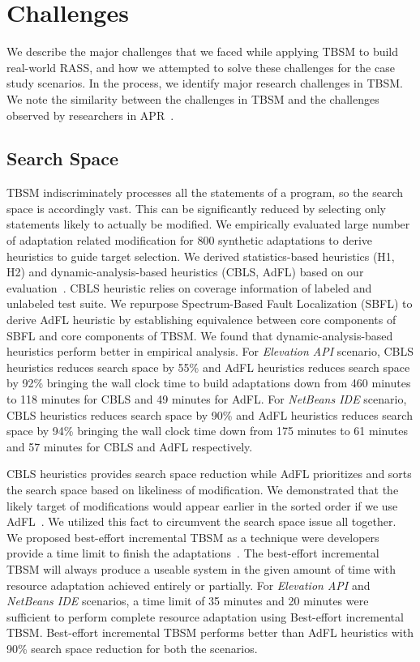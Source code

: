 \section{Challenges}
We describe the major challenges that we faced while applying TBSM to build real-world RASS, and how we attempted to solve these challenges for the case study scenarios. In the process, we identify major research challenges in TBSM. We note the similarity between the challenges in TBSM and the challenges observed by researchers in APR~\cite{LeGoues2013}.

\subsection{Search Space}
TBSM indiscriminately processes all the statements of a program, so the search space is accordingly vast. This can be significantly reduced by selecting only statements likely to actually be modified. We empirically evaluated large number of adaptation related modification for 800 synthetic adaptations to derive heuristics to guide target selection. We derived statistics-based heuristics (H1, H2) and dynamic-analysis-based heuristics (CBLS, AdFL) based on our evaluation~\cite{christi2018qrs,christi2019qrs}. CBLS heuristic relies on coverage information of labeled and unlabeled test suite. We repurpose Spectrum-Based Fault Localization (SBFL) to derive AdFL heuristic by establishing equivalence between core components of SBFL and core components of TBSM. We found that dynamic-analysis-based heuristics  perform better in empirical analysis. For \textit{Elevation API} scenario, CBLS heuristics reduces search space by 55\% and AdFL heuristics reduces search space by 92\% bringing the wall clock time to build adaptations down from 460 minutes to 118 minutes for CBLS and 49 minutes for AdFL.  For \textit{NetBeans IDE} scenario, CBLS heuristics reduces search space by 90\% and AdFL heuristics reduces search space by 94\% bringing the wall clock time down from 175 minutes to 61 minutes and 57 minutes for CBLS and AdFL respectively. 

CBLS heuristics provides search space reduction while AdFL prioritizes and sorts the search space based on likeliness of modification. We demonstrated that the likely target of modifications would appear earlier in the sorted order if we use AdFL~\cite{christi2019qrs}. We utilized this fact to circumvent the search space issue all together. We proposed best-effort incremental TBSM as a technique were developers provide a time limit to finish the adaptations~\cite{christi2019qrs}. The best-effort incremental TBSM will always produce a useable system in the given amount of time with resource adaptation achieved entirely or partially. For \textit{Elevation API} and \textit{NetBeans IDE} scenarios, a time limit of 35 minutes and 20 minutes were sufficient to perform complete resource adaptation using Best-effort incremental TBSM. Best-effort incremental TBSM performs better than AdFL heuristics with 90\% search space reduction for both the scenarios. 

